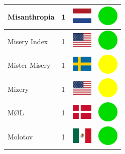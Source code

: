 \documentclass[12pt, a4paper, twoside]{report}
\begin{document}
\begin{center}
\begin{longtable}{|p{5cm}|p{2cm}|p{2cm}|p{2cm}|}
			Misanthropia & 1 & \includegraphics[width=1cm]{4x3/nl} & \includegraphics[width=1cm]{likes/y} \\ \hline
			Misery Index & 1 & \includegraphics[width=1cm]{4x3/us} & \includegraphics[width=1cm]{likes/y} \\ \hline
			Mister Misery & 1 & \includegraphics[width=1cm]{4x3/se} & \includegraphics[width=1cm]{likes/m} \\ \hline
			Mizery & 1 & \includegraphics[width=1cm]{4x3/us} & \includegraphics[width=1cm]{likes/m} \\ \hline
			MØL & 1 & \includegraphics[width=1cm]{4x3/dk} & \includegraphics[width=1cm]{likes/y} \\ \hline
			Molotov & 1 & \includegraphics[width=1cm]{4x3/mx} & \includegraphics[width=1cm]{likes/y} \\ \hline

\end{longtable}
\end{center}
\end{document}
